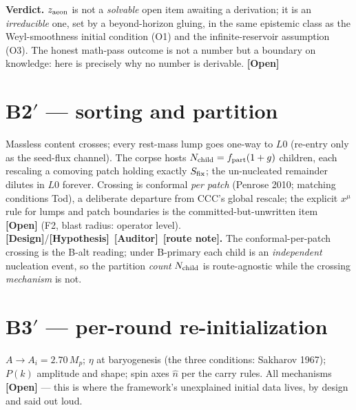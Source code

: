 \documentclass[11pt]{article}
\newcommand{\Open}{\textbf{\textcolor{gray!10!black}{[Open]}}}
\newcommand{\Auditor}{\textbf{\textcolor{teal!55!black}{[Auditor]}}}
\newcommand{\hyp}{\textcolor{orange!80!black}{\textbf{[Hypothesis]}}}
\newcommand{\design}{\textcolor{blue!60!black}{\textbf{[Design]}}}
\newcommand{\open}{\textcolor{red!70!black}{\textbf{[Open]}}}
\begin{document}
\textbf{Verdict.} $z_{\rm aeon}$ is not a \emph{solvable} open item awaiting a derivation; it is an \emph{irreducible} one, set by a beyond-horizon gluing, in the same epistemic class as the Weyl-smoothness initial condition (O1) and the infinite-reservoir assumption (O3). The honest math-pass outcome is not a number but a boundary on knowledge: here is precisely why no number is derivable. \Open


\section{B2$'$ --- sorting and partition}
Massless content crosses; every rest-mass lump goes one-way to $L0$ (re-entry only as the seed-flux channel). The corpse hosts $N_{\rm child}=f_{\rm part}(1+g)$ children, each rescaling a comoving patch holding exactly $S_{\rm fix}$; the un-nucleated remainder dilutes in $L0$ forever. Crossing is conformal \emph{per patch} (Penrose 2010; matching conditions Tod), a deliberate departure from CCC's global rescale; the explicit $x^\mu$ rule for lumps and patch boundaries is the committed-but-unwritten item \open{} (F2, blast radius: operator level). \design/\hyp\ \Auditor\ \textbf{[route note].} The conformal-per-patch crossing is the B-alt reading; under B-primary each child is an \emph{independent} nucleation event, so the partition \emph{count} $N_{\rm child}$ is route-agnostic while the crossing \emph{mechanism} is not.

\section{B3$'$ --- per-round re-initialization}
$A\to A_i=2.70\,M_p$; $\eta$ at baryogenesis (the three conditions: Sakharov 1967); $P(k)$ amplitude and shape; spin axes $\hat n$ per the carry rules. All mechanisms \open{} --- this is where the framework's unexplained initial data lives, by design and said out loud.

\end{document}
